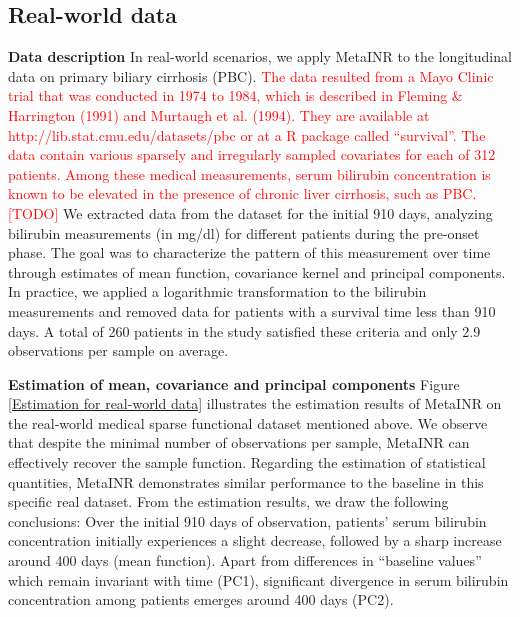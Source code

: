 \documentclass{article}
\begin{document}
\subsection{Real-world data}
\textbf{Data description} 
In real-world scenarios, we apply MetaINR to the longitudinal data on primary biliary cirrhosis (PBC).
\textcolor{red}{The data resulted from a Mayo Clinic trial that was conducted in 1974 to 1984, 
which is described in Fleming \& Harrington (1991) and Murtaugh et al. (1994). 
They are available at http://lib.stat.cmu.edu/datasets/pbc or at a R package called ``survival''.
The data contain various sparsely and irregularly sampled covariates for each of 312 patients. 
Among these medical measurements,
serum bilirubin concentration is known to be elevated in the presence of chronic liver cirrhosis, such as PBC.
[TODO]
}
We extracted data from the dataset for the initial 910 days, 
analyzing bilirubin measurements (in mg/dl) for different patients 
during the pre-onset phase. 
The goal was to characterize the pattern of this measurement over time through estimates of mean function, covariance kernel and principal components.
In practice, we applied a logarithmic transformation to the bilirubin measurements and removed data for patients with a survival time less than 910 days.
A total of 260 patients in the study satisfied these criteria and only 2.9 observations per sample on average. 

\textbf{Estimation of mean, covariance and principal components}
Figure \ref{Estimation for real-world data} illustrates the estimation results of MetaINR on the real-world medical sparse functional dataset mentioned above. 
We observe that despite the minimal number of observations per sample, 
MetaINR can effectively recover the sample function. 
Regarding the estimation of statistical quantities, 
MetaINR demonstrates similar performance to the baseline in this specific real dataset.
From the estimation results, we draw the following conclusions: 
Over the initial 910 days of observation, patients' serum bilirubin concentration initially experiences a slight decrease, 
followed by a sharp increase around 400 days (mean function). 
Apart from differences in ``baseline values'' which remain invariant with time (PC1), 
significant divergence in serum bilirubin concentration among patients emerges around 400 days (PC2).
\end{document}
